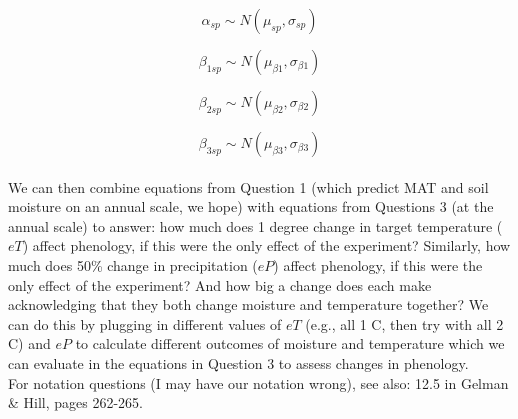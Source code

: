 \documentclass[12pt,a4paper]{article}
\begin{document}
\begin{equation}
\alpha_{sp} \sim N(\mu_{sp}, \sigma_{sp})
\end{equation}

\begin{equation}
\beta_{1 sp} \sim N(\mu_{\beta1}, \sigma_{\beta1})
\end{equation}

\begin{equation}
\beta_{2 sp} \sim N(\mu_{\beta2}, \sigma_{\beta2})
\end{equation}

\begin{equation}
\beta_{3 sp} \sim N(\mu_{\beta3}, \sigma_{\beta3})
\end{equation}
\vspace{2ex}\\

\noindent We can then combine equations from Question 1 (which predict MAT and soil moisture on an annual scale, we hope) with equations from Questions 3 (at the annual scale) to answer: how much does 1 degree change in target temperature ($eT$) affect phenology, if this were the only effect of the experiment? Similarly, how much does 50\% change in precipitation ($eP$) affect phenology, if this were the only effect of the experiment? And how big a change does each make acknowledging that they both change moisture and temperature together? We can do this by plugging in different values of $eT$ (e.g., all 1 C, then try with all 2 C) and $eP$ to calculate different outcomes of moisture and temperature which we can evaluate in the equations in Question 3 to assess changes in phenology. \\

\noindent For notation questions (I may have our notation wrong), see also: 12.5 in Gelman \& Hill, pages 262-265.
\end{document}
